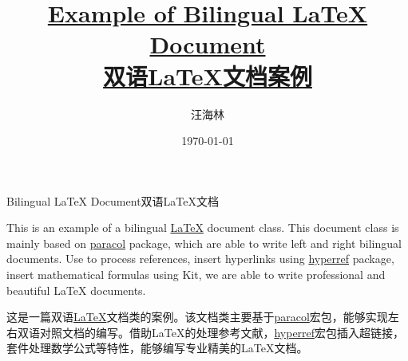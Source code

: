 \documentclass{bilidoc}
\title{\textbf{\href{https://github.com/wanghailin08/bilidoc}{Example of Bilingual \LaTeX{} Document\\双语\LaTeX{}文档案例}}}
\author{汪海林}
\date{\today}
\begin{document}
\maketitle

\vspace{20mm}

\tableofcontents

\newpage

\begin{Abstract}{Bilingual \LaTeX{} Document}{双语\LaTeX{}文档}

    This is an example of a bilingual \href{https://www.latex-project.org/}{\LaTeX{}} document class. This document class is mainly based on \href{https://www.ctan.org/pkg/paracol}{paracol} package, which are able to write left and right bilingual documents. Use \href{http://www.bibtex.org/}{\BibTeX{}} to process references, insert hyperlinks using \href{https://www.ctan.org/pkg/hyperref}{hyperref} package, insert mathematical formulas using \href{https://www.ctan.org/pkg/amstex}{\AMSTeX} Kit, we are able to write professional and beautiful \LaTeX{} documents.

    \switchcolumn

    这是一篇双语\href{https://www.latex-project.org/}{\LaTeX{}}文档类的案例。该文档类主要基于\href{https://www.ctan.org/pkg/paracol}{paracol}宏包，能够实现左右双语对照文档的编写。借助\LaTeX{}的\href{http://www.bibtex.org/}{\BibTeX{}}处理参考文献，\href{https://www.ctan.org/pkg/hyperref}{hyperref}宏包插入超链接，\href{https://www.ctan.org/pkg/amstex}{\AMSTeX}套件处理数学公式等特性，能够编写专业精美的\LaTeX{}文档。

\end{Abstract}




\end{document}
